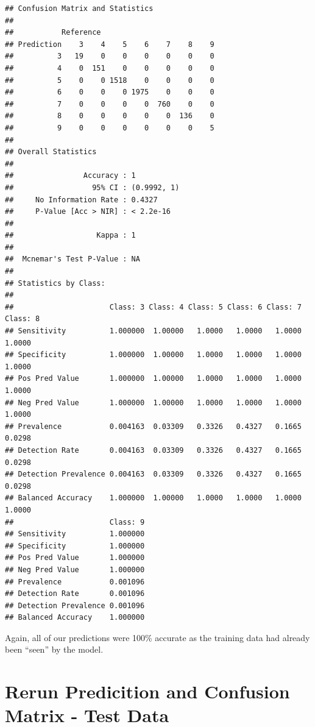 \documentclass[
]{book}
\newenvironment{Shaded}{\begin{snugshade}}{\end{snugshade}}
\newcommand{\FunctionTok}[1]{\textcolor[rgb]{0.00,0.00,0.00}{#1}}
\newcommand{\NormalTok}[1]{#1}
\newcommand{\SpecialCharTok}[1]{\textcolor[rgb]{0.00,0.00,0.00}{#1}}
\begin{document}
\begin{Shaded}
\end{Shaded}

\begin{verbatim}
## Confusion Matrix and Statistics
## 
##           Reference
## Prediction    3    4    5    6    7    8    9
##          3   19    0    0    0    0    0    0
##          4    0  151    0    0    0    0    0
##          5    0    0 1518    0    0    0    0
##          6    0    0    0 1975    0    0    0
##          7    0    0    0    0  760    0    0
##          8    0    0    0    0    0  136    0
##          9    0    0    0    0    0    0    5
## 
## Overall Statistics
##                                      
##                Accuracy : 1          
##                  95% CI : (0.9992, 1)
##     No Information Rate : 0.4327     
##     P-Value [Acc > NIR] : < 2.2e-16  
##                                      
##                   Kappa : 1          
##                                      
##  Mcnemar's Test P-Value : NA         
## 
## Statistics by Class:
## 
##                      Class: 3 Class: 4 Class: 5 Class: 6 Class: 7 Class: 8
## Sensitivity          1.000000  1.00000   1.0000   1.0000   1.0000   1.0000
## Specificity          1.000000  1.00000   1.0000   1.0000   1.0000   1.0000
## Pos Pred Value       1.000000  1.00000   1.0000   1.0000   1.0000   1.0000
## Neg Pred Value       1.000000  1.00000   1.0000   1.0000   1.0000   1.0000
## Prevalence           0.004163  0.03309   0.3326   0.4327   0.1665   0.0298
## Detection Rate       0.004163  0.03309   0.3326   0.4327   0.1665   0.0298
## Detection Prevalence 0.004163  0.03309   0.3326   0.4327   0.1665   0.0298
## Balanced Accuracy    1.000000  1.00000   1.0000   1.0000   1.0000   1.0000
##                      Class: 9
## Sensitivity          1.000000
## Specificity          1.000000
## Pos Pred Value       1.000000
## Neg Pred Value       1.000000
## Prevalence           0.001096
## Detection Rate       0.001096
## Detection Prevalence 0.001096
## Balanced Accuracy    1.000000
\end{verbatim}

Again, all of our predictions were 100\% accurate as the training data had already been ``seen'' by the model.

\hypertarget{rerun-predicition-and-confusion-matrix---test-data}{%
\section{Rerun Predicition and Confusion Matrix - Test Data}\label{rerun-predicition-and-confusion-matrix---test-data}}
\end{document}
